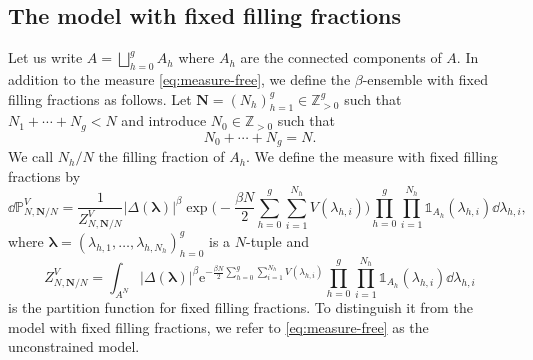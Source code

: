 \documentclass[pdftex]{sigma}
\numberwithin{equation}{section}
\newcommand{\ee}{\mathrm{e}}
\newcommand{\NN}{\mathbb{Z}_{>0}}
\newcommand{\ind}{\mathds{1}}
\begin{document}
\subsection{The model with fixed filling fractions}

Let us write $A = \bigsqcup_{h=0}^{g} A_{h}$ where $A_h$ are the connected components of $A$. In addition to the measure \eqref{eq:measure-free}, we define the
$\beta$-ensemble with fixed filling fractions as follows. Let
$\bm{N} = (N_{h})_{h = 1}^{g} \in \NN^{g}$ such that $N_1 + \cdots + N_g < N$ and introduce $N_0 \in \mathbb{Z}_{> 0}$ such that
\[
 N_{0} + \cdots + N_{g} = N.
\]
We call $N_h/N$ the filling fraction of $A_h$. We define the measure with fixed filling fractions by
\begin{equation*}%
 \dd\mathbb{P}_{N,\bm{N}/N}^V = \frac{1}{Z^{V}_{N,\bm{N}/N}}|\Delta(\bm{\lambda})|^{\beta}\exp\Biggl(-\frac{\beta N}{2}\sum_{h = 0}^{g} \sum_{i = 1}^{N_h} V(\lambda_{h, i})\Biggr)\prod_{h=0}^{g}\prod_{i=1}^{N_h}\ind_{A_{h}}(\lambda_{h, i})\dd\lambda_{h, i},
\end{equation*}
where
$\bm{\lambda} = (\lambda_{h, 1}, \ldots, \lambda_{h, N_{h}})_{h = 0}^{g}$ is a $N$-tuple and
\begin{equation*}
 Z^{V}_{N,\bm{N}/N} = \int_{A^{N}} |\Delta(\bm{\lambda})|^{\beta}\ee^{-\frac{\beta N}{2}\sum_{h = 0}^{g} \sum_{i = 1}^{N_h} V(\lambda_{h, i})}\prod_{h=0}^{g}\prod_{i=1}^{N_h}\ind_{A_{h}}(\lambda_{h, i})\dd\lambda_{h, i}
\end{equation*}
is the partition function for fixed filling fractions. To distinguish it from the model with fixed filling fractions, we refer to \eqref{eq:measure-free} as the unconstrained model.
\end{document}
